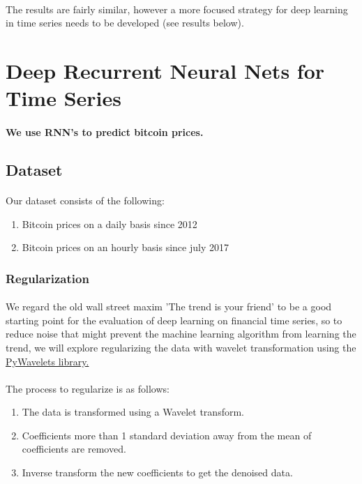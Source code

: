 \documentclass{article}
\begin{document}
\paragraph{}
The results are fairly similar, however a more focused strategy for deep learning in time series needs to be developed (see results below).


\section{Deep Recurrent Neural Nets for Time Series}
\paragraph{We use RNN's to predict bitcoin prices.}

\subsection{Dataset}
\paragraph{}
Our dataset consists of the following:
\begin{enumerate}
    \item Bitcoin prices on a daily basis since 2012
    \item Bitcoin prices on an hourly basis since july 2017
\end{enumerate}

\subsubsection{Regularization}
\paragraph{}
We regard the old wall street maxim 'The trend is your friend' to be a good starting point for the evaluation of deep learning on financial time series, so to reduce noise that might prevent the machine learning algorithm from learning the trend, we will explore regularizing the data with wavelet transformation using the \href{https://pywavelets.readthedocs.io/en/latest/#main-features}{PyWavelets library.}

\paragraph{}
The process to regularize is as follows:
\begin{enumerate}
\item The data is transformed using a Wavelet transform.
\item Coefficients more than 1 standard deviation away from the mean of coefficients are removed.
\item Inverse transform the new coefficients to get the denoised data.
\end{enumerate}
\end{document}
